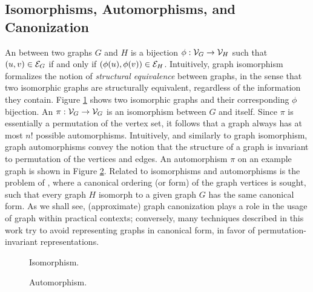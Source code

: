 \subsection{Isomorphisms, Automorphisms, and Canonization} \label{sec:isomorphisms}
An  between two graphs $G$ and $H$ is a bijection $\phi: \Cal{V}_G \rightarrow \Cal{V}_H$ such that $(u,v) \in \Cal{E}_G$ if and only if $(\phi(u),\phi(v)) \in \Cal{E}_H$. Intuitively, graph isomorphism formalizes the notion of \emph{structural equivalence} between graphs, in the sense that two isomorphic graphs are structurally equivalent, regardless of the information they contain. Figure \ref{fig:isomorphism} shows two isomorphic graphs and their corresponding $\phi$ bijection. An  $\pi: \Cal{V}_G \rightarrow \Cal{V}_G$ is an isomorphism between $G$ and itself. Since $\pi$ is essentially a permutation of the vertex set, it follows that a graph always has at most $n!$ possible automorphisms. Intuitively, and similarly to graph isomorphism, graph automorphisms convey the notion that the structure of a graph is invariant to permutation of the vertices and edges. An automorphism $\pi$ on an example graph is shown
in Figure \ref{fig:automorphism}. Related to isomorphisms and automorphisms is the problem of , where a canonical ordering (or form) of the graph vertices is sought, such that every graph $H$ isomorph to a given graph $G$ has the same canonical form. As we shall see, (approximate) graph canonization plays a role in the usage of graph within practical contexts; conversely, many techniques described in this work try to avoid representing graphs in canonical form, in favor of permutation-invariant representations.

\begin{figure*}
    \begin{subfigure}[b]{0.48\linewidth}
        \centering
        \resizebox{.9\textwidth}{!}{}
        \caption{Isomorphism.}
        \label{fig:isomorphism}
    \end{subfigure}
    \begin{subfigure}[b]{0.48\linewidth}
        \centering
        \resizebox{.9\textwidth}{!}{}
        \caption{Automorphism.}
        \label{fig:automorphism}
    \end{subfigure}
    \caption{An example of isomorphism and automorphism.}
\end{figure*}


